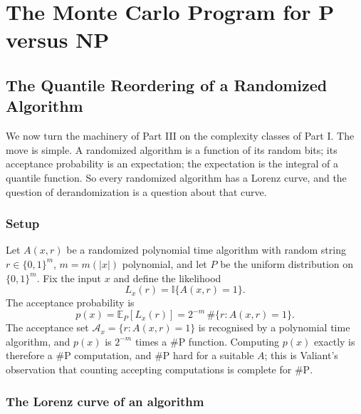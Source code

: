 \documentclass[11pt,twoside,openany]{book}
\theoremstyle{plain}
\theoremstyle{definition}
\theoremstyle{remark}
\newcommand{\EE}{\mathbb{E}}
\newcommand{\Ind}{\mathbb{I}}
\newcommand{\sharpP}{\#\mathrm{P}}
\begin{document}




















\part{The Monte Carlo Program for P versus NP}



\chapter{The Quantile Reordering of a Randomized Algorithm}
\label{ch:reorder}

We now turn the machinery of Part III on the complexity classes of Part I. The move is simple. A randomized algorithm is a function of its random bits; its acceptance probability is an expectation; the expectation is the integral of a quantile function. So every randomized algorithm has a Lorenz curve, and the question of derandomization is a question about that curve.

\section{Setup}

Let $A(x, r)$ be a randomized polynomial time algorithm with random string $r \in \{0, 1\}^{m}$, $m = m(|x|)$ polynomial, and let $P$ be the uniform distribution on $\{0,1\}^m$. Fix the input $x$ and define the likelihood
\[
L_x(r) = \Ind\{ A(x, r) = 1 \} .
\]
The acceptance probability is
\[
p(x) = \EE_P[ L_x(r) ] = 2^{-m} \, \#\{ r : A(x, r) = 1 \} .
\]
The acceptance set $\mathcal{A}_x = \{ r : A(x, r) = 1 \}$ is recognised by a polynomial time algorithm, and $p(x)$ is $2^{-m}$ times a $\sharpP$ function. Computing $p(x)$ exactly is therefore a $\sharpP$ computation, and $\sharpP$ hard for a suitable $A$; this is Valiant's observation that counting accepting computations is complete for $\sharpP$.

\section{The Lorenz curve of an algorithm}
\end{document}
